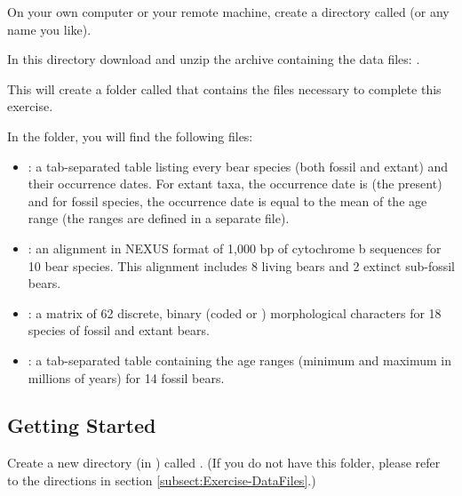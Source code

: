 {\begin{framed}
On your own computer or your remote machine, create a directory called {\textcolor{red}{}} (or any name you like). 

In this directory download and unzip the archive containing the data files: \href{https://github.com/revbayes/revbayes_tutorial/raw/master/RB_TotalEvidenceDating_FBD_Tutorial/data.zip}{}.

This will create a folder called  that contains the files necessary to complete this exercise.
\end{framed}}


In the  folder, you will find the following files:
\begin{itemize}[noitemsep,topsep=0pt]
\item {}: a tab-separated table listing every bear species (both fossil and extant) and their occurrence dates. For extant taxa, the occurrence date is  (\IE the present) and for fossil species, the occurrence date is equal to the mean of the age range (the ranges are defined in a separate file).
\item {}: an alignment in NEXUS format of 1,000 bp of cytochrome b sequences for 10 bear species. This alignment includes 8 living bears and 2 extinct sub-fossil bears.
\item {}: a matrix of 62 discrete, binary (coded  or ) morphological characters for 18 species of fossil and extant bears.
\item {}: a tab-separated table containing the age ranges (minimum and maximum in millions of years) for 14 fossil bears.
\end{itemize}

\bigskip
\subsection{Getting Started}\label{subsect:Exercise-GetStart}

{\begin{framed}
Create a new directory (in ) called {\textcolor{red}{}}. (If you do not have this folder, please refer to the directions in section \ref{subsect:Exercise-DataFiles}.)
\end{framed}}

